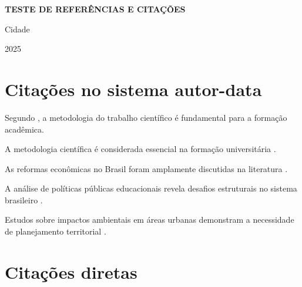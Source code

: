 \documentclass[a4paper, 12pt]{report}
\begin{document}
\pagestyle{empty}

\begin{titlepage}
  \centering\vfill
  {\Large\bfseries TESTE DE REFERÊNCIAS E CITAÇÕES}\par
  \vfill
  Cidade\par 2025
\end{titlepage}

\imprimirsumario


\chapter{Citações no sistema autor-data}

Segundo \textcite{severino2007}, a metodologia do trabalho científico é
fundamental para a formação acadêmica.

A metodologia científica é considerada essencial na formação universitária
\parencite{severino2007}.

As reformas econômicas no Brasil foram amplamente discutidas na literatura
\parencite{urani1994}.

A análise de políticas públicas educacionais revela desafios estruturais no
sistema brasileiro \parencite{souza2019}.

Estudos sobre impactos ambientais em áreas urbanas demonstram a necessidade de
planejamento territorial \parencite{silva2015}.

\chapter{Citações diretas}
\end{document}
